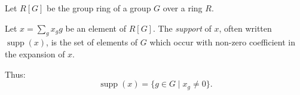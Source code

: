 \documentclass[12pt]{article}
\newcommand{\supp}{\operatorname{supp}}
\begin{document}
Let $R[G]$ be the group ring of a group $G$ over a ring $R$.

Let $x = \sum_g x_g g$ be an element of $R[G]$.  The \emph{support} of $x$, often written $\supp(x)$, is the set of elements of $G$ which occur with non-zero coefficient in the expansion of $x$.

Thus:
$$\supp(x) = \{ g \in G \mid x_g \neq 0 \}.$$
\end{document}
